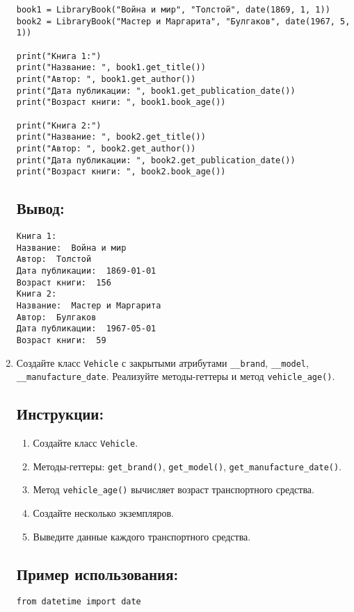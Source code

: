 \begin{enumerate}
\begin{lstlisting}[caption=Пример кода]
book1 = LibraryBook("Война и мир", "Толстой", date(1869, 1, 1))
book2 = LibraryBook("Мастер и Маргарита", "Булгаков", date(1967, 5, 1))

print("Книга 1:")
print("Название: ", book1.get_title())
print("Автор: ", book1.get_author())
print("Дата публикации: ", book1.get_publication_date())
print("Возраст книги: ", book1.book_age())

print("Книга 2:")
print("Название: ", book2.get_title())
print("Автор: ", book2.get_author())
print("Дата публикации: ", book2.get_publication_date())
print("Возраст книги: ", book2.book_age())
\end{lstlisting}

\subsection*{Вывод:}
\begin{lstlisting}[caption=Ожидаемый вывод]
Книга 1:
Название:  Война и мир
Автор:  Толстой
Дата публикации:  1869-01-01
Возраст книги:  156
Книга 2:
Название:  Мастер и Маргарита
Автор:  Булгаков
Дата публикации:  1967-05-01
Возраст книги:  59
\end{lstlisting}

\item
Создайте класс \texttt{Vehicle} с закрытыми атрибутами \texttt{\_\_brand}, \texttt{\_\_model}, \texttt{\_\_manufacture\_date}. Реализуйте методы-геттеры и метод \texttt{vehicle\_age()}.

\subsection*{Инструкции:}
\begin{enumerate}
    \item Создайте класс \texttt{Vehicle}.
    \item Методы-геттеры: \texttt{get\_brand()}, \texttt{get\_model()}, \texttt{get\_manufacture\_date()}.
    \item Метод \texttt{vehicle\_age()} вычисляет возраст транспортного средства.
    \item Создайте несколько экземпляров.
    \item Выведите данные каждого транспортного средства.
\end{enumerate}

\subsection*{Пример использования:}
\begin{lstlisting}[caption=Пример кода]
from datetime import date


\end{lstlisting}
\end{enumerate}
